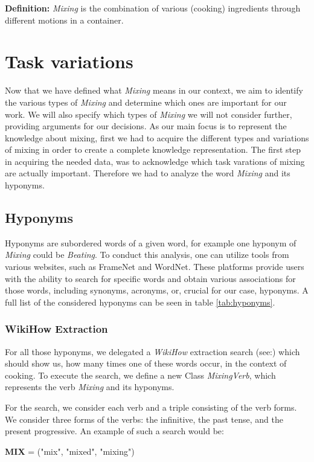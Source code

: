   \textbf{Definition:} \textit{Mixing} is the combination of various (cooking) ingredients through different motions in a container.
  

\section{Task variations}
Now that we have defined what \textit{Mixing} means in our context, we aim to identify the various types of \textit{Mixing} and determine which ones are important for our work. We will also specify which types of \textit{Mixing} we will not consider further, providing arguments for our decisions.
As our main focus is to represent the knowledge about mixing, first we had to acquire the different types and variations of mixing in order to create a complete
knowledge representation. The first step in acquiring the needed data, was to acknowledge which task varations of mixing are actually important. 
Therefore we had to analyze the word \textit{Mixing} and its hyponyms. 
\subsection*{Hyponyms} 
Hyponyms are subordered words of a given word, for example one hyponym of \textit{Mixing} could be \textit{Beating}\cite{oxford_hyponym}.
To conduct this analysis, one can utilize tools from various websites, such as FrameNet\cite{FrameNet} and WordNet\cite{WordNet}. These platforms provide users with the ability to search for specific words and obtain various associations for those words, including synonyms, acronyms, or, crucial for our case, hyponyms.	
A full list of the considered hyponyms can be seen in table \ref{tab:hyponyms}.
\subsubsection{WikiHow Extraction}
For all those hyponyms, we delegated a \textit{WikiHow} extraction search (see:) which should show us, how many times one of these words occur, in the context of cooking.
To execute the search, we define a new Class \textit{MixingVerb}, which represents the verb \textit{Mixing} and its hyponyms.

For the search, we consider each verb and a triple consisting of the verb forms. We consider three forms of the verbs: the infinitive, the past tense, and the present progressive. An example of such a search would be:
\begin{center}
  \textbf{MIX} = ("mix", "mixed", "mixing")
\end{center}


